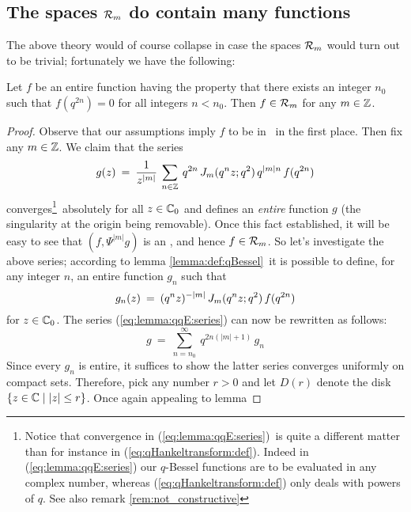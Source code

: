 

\subsection{The spaces ${\mathcal R}_{m}$ do contain many functions}

The above theory would of course collapse in case the spaces ${\mathcal R}_{m}$ would
turn out to be trivial; fortunately we have the following:


\begin{lemma} \label{lemma:compactsupp_in_holS}
Let\/ $f$ be an entire function having the property that there
exists an integer\/ $n_0$ such that\/ $f(q^{2n})=0$ for all integers\/ $n<n_0$.
Then\/ $f \in {\mathcal R}_{m}$ for any\/ $m\in \mathbb{Z}$.
\end{lemma}

\begin{proof}
Observe that our assumptions imply $f$ to be in \Swqbis\ in the first place.
Then fix any $m\in \mathbb{Z}$. We claim that the series
\begin{equation}\label{eq:lemma:qqE:series}
    g(z) \:=\: \frac{1}{z^{|m|}}\: \sum_{n\in\mathbb{Z}} \:
                 q^{2n} \, J_{m}(q^n z; q^2) \, q^{|m|n} \, f(q^{2n})
\end{equation}
converges\footnote{Notice that convergence in (\ref{eq:lemma:qqE:series})\
is quite a different matter than for instance in (\ref{eq:qHankeltransform:def}).
Indeed in (\ref{eq:lemma:qqE:series}) our $q$-Bessel functions are
to be evaluated in any complex number, whereas (\ref{eq:qHankeltransform:def})
only deals with powers of $q$.
See also remark \ref{rem:not_constructive}}\ absolutely for all $z\in \mathbb{C}_0$ and defines an
{\em entire\/} function $g$ (the singularity at the origin being removable).
Once this fact established, it will be easy to see that $(f, \Psi^{|m|} g)$
is an \Hmpair, and hence $f \in {\mathcal R}_{m}$.
So let's investigate the above series; according to lemma \ref{lemma:def:qBessel}\
it is possible to define, for any integer $n$, an entire function $g_n$ such that
$$ g_n (z) \:=\:  (q^n z)^{-|m|} \, J_{m}(q^n z; q^2) \,f(q^{2n}) $$
for $z\in \mathbb{C}_0$.
The series (\ref{eq:lemma:qqE:series}) can now be rewritten as follows:
\begin{equation}\label{eq:lemma:qqE:series:rewrite}
  g \:=\: \sum_{n=n_0}^\infty \:  q^{2n(|m|+1)}\,g_n
\end{equation}
Since every $g_n$ is entire, it suffices  to show the latter series converges
uniformly on compact sets. Therefore, pick any number $r>0$ and let $D(r)$
denote the disk $\{z\in \mathbb{C} \mid |z| \leq r\}$. Once again appealing to lemma

\end{proof}
